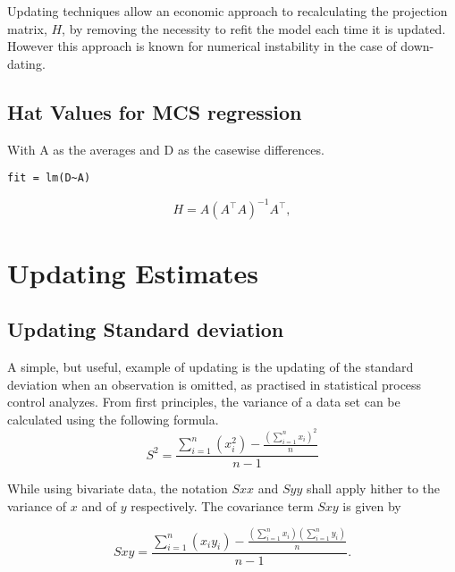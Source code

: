 \documentclass[MAIN.tex]{subfiles}
\begin{document}
Updating techniques allow an economic approach to recalculating the projection matrix, $H$, by removing the necessity to refit the model each time it is updated. However this approach is known for
numerical instability in the case of down-dating.



\subsection{Hat Values for MCS regression}

With A as the averages and D as the casewise differences.
\begin{verbatim}
fit = lm(D~A)
\end{verbatim}

\begin{displaymath}
H = A \left(A^\top  A\right)^{-1} A^\top ,
\end{displaymath}

	




\section{Updating Estimates} %



\subsection{Updating Standard deviation}
A simple, but useful, example of updating is the updating of the standard deviation when an observation is omitted, as practised in statistical process control analyzes. From first principles, the variance of a data set can be calculated using the following formula.
\begin{equation}
S^{2}=\frac{\sum_{i=1}^{n}(x_{i}^{2})-\frac{(\sum_{i=1}^{n}x_{i})^{2}}{n}}{n-1}
\end{equation}


While using bivariate data, the notation $Sxx$ and $Syy$ shall apply hither to the variance of $x$ and of $y$ respectively. The covariance term $Sxy$ is given by


\begin{equation}
Sxy=\frac{\sum_{i=1}^{n}(x_{i}y_{i})-\frac{(\sum_{i=1}^{n}x_{i})(\sum_{i=1}^{n}y_{i})}{n}}{n-1}.
\end{equation}
\end{document}
